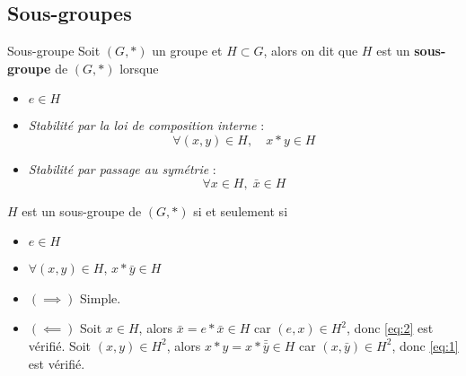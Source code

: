 \subsection{Sous-groupes} %
\label{sub:Sous-groupes}

\begin{Definition}[colbacktitle=red!75!black]{Sous-groupe}{}
Soit $(G, {*})$ un groupe et $H \subset G$, alors on dit que $H$ est un \textbf{sous-groupe} de $(G, *)$ lorsque 
\begin{itemize}

  \item $e \in H$ 
  \item \textit{Stabilité par la loi de composition interne} : 
    \begin{equation}
      \label{eq:1}
      \forall (x, y) \in H, \quad x * y \in H 
    \end{equation}

  \item \textit{Stabilité par passage au symétrie} : 
    \begin{equation}
      \label{eq:2}
      \forall x \in H, \; \bar{x} \in H
    \end{equation}

\end{itemize}
\end{Definition}

\begin{Prop}{}{}
$H$ est un sous-groupe de $(G,*)$ si et seulement si 
\begin{itemize}

    \item $e \in H$ 
    \item $\forall (x, y) \in H$, $x * \bar{y} \in H$

\end{itemize}
\end{Prop}

\begin{myproof}{}{}
\begin{itemize}

    \item $(\implies)$ Simple. 
    \item $(\impliedby)$ Soit $x \in H$, alors $\bar{x} = e * \bar{x} \in H$ car $(e,x) \in H ^{2}$, donc \ref{eq:2} est vérifié.
      Soit $(x,y) \in H ^{2}$, alors $x * y = x * \bar{\bar{y}} \in H$ car $(x, \bar{y}) \in H ^{2}$, donc \ref{eq:1} est vérifié.

\end{itemize}
\end{myproof}

